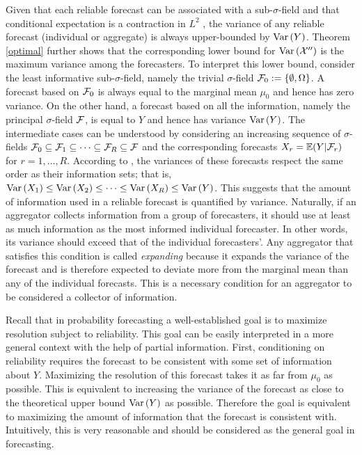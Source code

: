 \documentclass[11pt]{article}
\newcommand{\E}{\mathbb{E}}
\theoremstyle{definition}
\theoremstyle{definition}
\def\F{{\cal F}}
\def\E{{\mathbb E}}
\def\Var{{\rm Var}\,}
\begin{document}
Given that each reliable forecast can be associated with a sub-$\sigma$-field and  that conditional expectation is a contraction in $L^2$ \citep[Theorem 5.1.4.]{durrett2010probability}, the variance of any reliable forecast (individual or aggregate) is always upper-bounded by $\Var(Y)$. 
Theorem \ref{optimal} further shows that the corresponding lower bound for $\Var(\mathcal{X}'')$ is the maximum variance among the forecasters. To interpret this lower bound, consider the least informative sub-$\sigma$-field, namely the trivial $\sigma$-field $\F_0 := \{\emptyset, \Omega\}$. A forecast based on $\F_0$ is always equal to the marginal mean $\mu_0$ and hence has zero variance. On the other hand, a forecast based on all the information, namely the principal $\sigma$-field $\F$, is equal to $Y$ and hence has variance $\Var(Y)$. 
The intermediate cases can be understood by considering an increasing sequence of $\sigma$-fields $\F_0 \subseteq \F_1 \subseteq \dots \subseteq \F_R \subseteq \F$ and the corresponding forecasts $X_r = \E(Y|\F_r)$ for $r = 1, \dots, R$. According to \citet[Proposition 2.1]{satopaamodeling2}, the variances of these forecasts respect the same order as their information sets; that is, $\Var(X_1) \leq \Var(X_2) \leq \dots \leq \Var(X_R) \leq \Var(Y)$. This suggests that the amount of information used in a reliable forecast is quantified by variance. Naturally, if an aggregator collects information from a group of forecasters, it should use at least as much information as the most informed individual forecaster. In other words, its variance should exceed that of the individual forecasters'. Any aggregator that satisfies this condition is called \textit{expanding} because it expands the variance of the forecast and is therefore expected to deviate more from the marginal mean than any of the individual forecasts. This is a necessary condition for an aggregator to be considered a collector of information. 


Recall that in probability forecasting a well-established goal is to maximize resolution subject to reliability. This goal can be easily interpreted in a more general context with the help of partial information. First, conditioning on reliability requires the forecast to be consistent with some set of information about $Y$. Maximizing the resolution of this forecast takes it as far from $\mu_0$ as possible. This is equivalent to increasing the variance of the forecast as close to the theoretical upper bound $\Var(Y)$ as possible. Therefore the goal is equivalent to maximizing the amount of information that the forecast is consistent with. Intuitively, this is very reasonable and should be considered as the general goal in forecasting.
\end{document}
